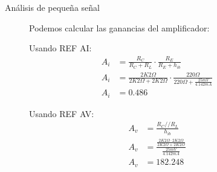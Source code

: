 \begin{frame}[allowframebreaks]{Análisis de pequeña señal}
  \begin{figure}[!ht]
    \raggedright
    Podemos calcular las ganancias del amplificador:\\
    \centering
    \begin{minipage}[t]{0.45\textwidth}
      Usando REF AI:
      \small
      \begin{align*}
        A_i &= \frac{R_C}{R_C + R_L} \cdot \frac{R_E}{R_E + h_{ib}}\\[6pt]
        A_i &= \frac{2K2\Omega}{2K2\Omega + 2K2\Omega} \cdot \frac{220\Omega}{220\Omega + \frac{25mV}{4.142mA}}\\[6pt]
        A_i &= 0.486
      \end{align*}
    \end{minipage}
    \hfill
    \begin{minipage}[t]{0.45\textwidth}
      Usando REF AV:
      \small
      \begin{align*}
        A_v &= \frac{R_C // R_L}{h_{ib}}\\[6pt]
        A_v &= \frac{\frac{2K2\Omega \cdot 2K2\Omega}{2K2\Omega + 2K2\Omega}}{\frac{25mV}{4.142mA}}\\[6pt]
        A_v &= 182.248
      \end{align*}
    \end{minipage}
  \end{figure}

\end{frame}
